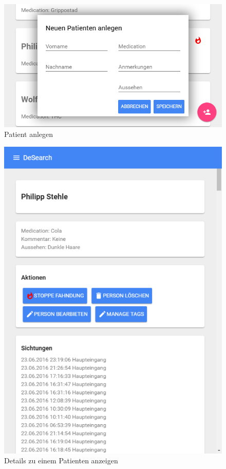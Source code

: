 \begin{figure}
	\centering
	\includegraphics[width=1.0\linewidth]{images/ui/personhinzufuegen}
	\caption{Patient anlegen}
	\label{img:ui/personhinzufuegen}
\end{figure}

\begin{figure}
	\centering
	\includegraphics[width=1.0\linewidth]{images/ui/persondetails}
	\caption{Details zu einem Patienten anzeigen}
	\label{img:ui/persondetails}
\end{figure}

